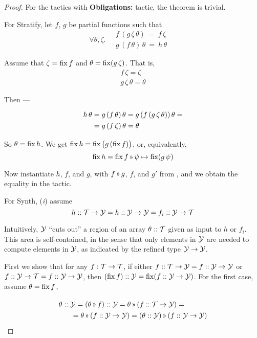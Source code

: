 \begin{proof}
For the tactics with {\bf Obligations:} tactic, the theorem is trivial.

\medskip
For {\sf Stratify}, let $f$, $g$ be partial functions such that
\[\renewcommand\arraystretch{1.3}
  \forall \theta,\zeta.\quad \begin{array}{l}f\,(g\,\zeta\,\theta) ~=~ f\,\zeta \\
  g\,(f\,\theta)\,\theta ~=~ h\,\theta
  \end{array}\quad\]
  
Assume that $\zeta = \operatorname{fix} f$ and $\theta = \operatorname{fix} (g\,\zeta)$. That is,
\[\renewcommand\arraystretch{1.3}
  \begin{array}{l}
    f\,\zeta = \zeta\\
    g\,\zeta\,\theta = \theta
  \end{array}\]
  
Then ---
\[\renewcommand\arraystretch{1.3}
  \begin{array}{l@{}l}
   h\,\theta & {}= g\,(f\,\theta)\,\theta = g\,(f\,(g\,\zeta\,\theta))\,\theta = \\
             & {}= g\,(f\,\zeta)\,\theta = \theta
  \end{array}\]
  
So $\theta = \operatorname{fix} h$. We get $\operatorname{fix} h = \operatorname{fix} \big(g \,(\operatorname{fix} f)\big)$, or, equivalently,
\[\fix h = \fix f \applt \psi\mapsto\fix (g\,\psi)\]

Now instantiate $h$, $f$, and $g$, with $f\applt g$, $f$, and $g'$ from ,
and we obtain the equality in the tactic.

\medskip
For {\sf Synth}, ({\it i}) assume
\[h :: \mathcal{T}\to\mathcal{Y} = h :: \mathcal{Y}\to\mathcal{Y} = f_i :: \mathcal{Y}\to\mathcal{T}\]

Intuitively, $\mathcal{Y}$ ``cuts out'' a region of an array $\theta :: \mathcal{T}$ given
as input to $h$ or $f_i$. This area is self-contained, in the sense that
only elements in $\mathcal{Y}$ are needed to compute elements in $\mathcal{Y}$, as indicated
by the refined type $\mathcal{Y}\to\mathcal{Y}$.

First we show that for any $f : \mathcal{T}\to\mathcal{T}$, if either $f :: \mathcal{T}\to\mathcal{Y} = f :: \mathcal{Y}\to\mathcal{Y}$
or $f :: \mathcal{Y}\to\mathcal{T} = f :: \mathcal{Y}\to\mathcal{Y}$, 
then $(\operatorname{fix} f)::\mathcal{Y} = \operatorname{fix} (f :: \mathcal{Y}\to\mathcal{Y})$. For the first case, assume $\theta=\operatorname{fix} f$,

\[\renewcommand\arraystretch{1.3}
  \begin{array}{l}
   \theta::\Y = (\theta\applt f)::\Y = \theta\applt(f::\T\to\Y) = \\
   \qquad=\theta\applt(f::\Y\to\Y) = (\theta::\Y)\applt(f::\Y\to\Y)
 \end{array}\]


\end{proof}
